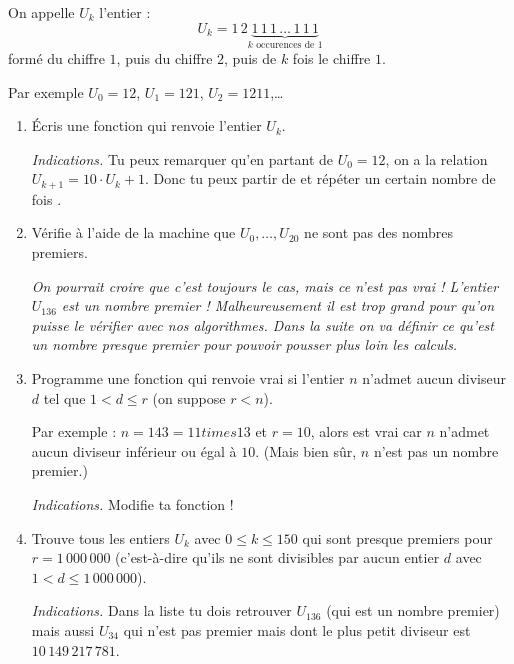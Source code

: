 \documentclass[11pt,class=report,crop=false]{standalone}
\begin{document}

\begin{activite}


On appelle $U_k$ l'entier :
$$U_k = 1\,2 \underbrace{1\,1\,1\,\ldots\,1\,1\,1}_{k \text{ occurences de } 1}$$
formé du chiffre $1$, puis du chiffre $2$, puis de $k$ fois le chiffre $1$.

Par exemple $U_0 = 12$, $U_1 = 121$, $U_2 = 1211$,\ldots




\begin{enumerate}
  \item \'Ecris une fonction  qui renvoie l'entier $U_k$.
  
  \emph{Indications.} Tu peux remarquer qu'en partant de $U_0=12$, on a la relation
  $U_{k+1} = 10 \cdot U_k + 1$. Donc tu peux partir de  et répéter un certain nombre de fois .
  
  \item Vérifie à l'aide de la machine que $U_0,\ldots,U_{20}$ ne sont pas des nombres premiers. 
  
  \medskip
  
 \emph{On pourrait croire que c'est toujours le cas, mais ce n'est pas vrai ! L'entier $U_{136}$ est un nombre premier ! Malheureusement il est trop grand pour qu'on puisse le vérifier avec nos algorithmes. Dans la suite on va définir ce qu'est un \emph{nombre presque premier} pour pouvoir pousser plus loin les calculs.}
  
  \item Programme une fonction  qui renvoie \og{}vrai\fg{} si l'entier $n$ n'admet aucun diviseur $d$ tel que $1< d \le r$ (on suppose $r<n$). 
  
  Par exemple : $n = 143 = 11 times 13$ et $r=10$, alors  est
  \og{}vrai\fg{} car $n$ n'admet aucun diviseur inférieur ou égal à $10$. (Mais bien sûr, $n$ n'est pas un nombre premier.)
  
  \emph{Indications.} Modifie ta fonction  !
  
  \item Trouve tous les entiers $U_k$ avec $0\le k \le 150$ qui sont presque premiers pour 
  $r = 1 \,000\,000$ (c'est-à-dire qu'ils ne sont divisibles par aucun entier $d$ avec $1<d \le 1\,000\,000$).
  
  \emph{Indications.} Dans la liste tu dois retrouver $U_{136}$ (qui est un nombre premier) mais aussi $U_{34}$ qui n'est pas premier mais dont le plus petit diviseur est
  $10\,149\,217\,781$.
\end{enumerate}   
     
\end{activite}
\end{document}
